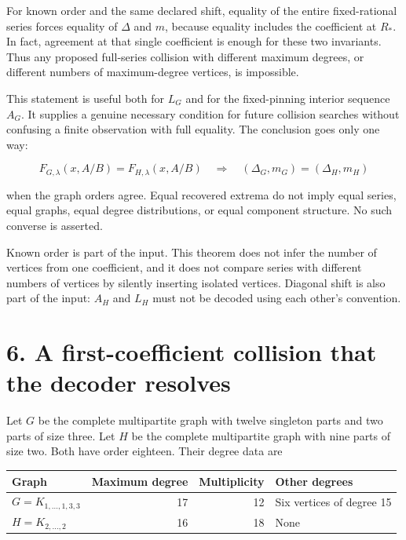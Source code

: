 \documentclass[
  11pt,
  a4paper,
]{report}
\begin{document}
For known order and the same declared shift, equality of the entire
fixed-rational series forces equality of \(\Delta\) and \(m\), because
equality includes the coefficient at \(R_*\). In fact, agreement at that
single coefficient is enough for these two invariants. Thus any proposed
full-series collision with different maximum degrees, or different
numbers of maximum-degree vertices, is impossible.

This statement is useful both for \(L_G\) and for the fixed-pinning
interior sequence \(A_G\). It supplies a genuine necessary condition for
future collision searches without confusing a finite observation with
full equality. The conclusion goes only one way:

\[
F_{G,\lambda}(x,A/B)=F_{H,\lambda}(x,A/B)
\quad\Longrightarrow\quad
(\Delta_G,m_G)=(\Delta_H,m_H)
\]

when the graph orders agree. Equal recovered extrema do not imply equal
series, equal graphs, equal degree distributions, or equal component
structure. No such converse is asserted.

Known order is part of the input. This theorem does not infer the number
of vertices from one coefficient, and it does not compare series with
different numbers of vertices by silently inserting isolated vertices.
Diagonal shift is also part of the input: \(A_H\) and \(L_H\) must not
be decoded using each other's convention.

\hypertarget{a-first-coefficient-collision-that-the-decoder-resolves}{%
\section{6. A first-coefficient collision that the decoder
resolves}\label{a-first-coefficient-collision-that-the-decoder-resolves}}

Let \(G\) be the complete multipartite graph with twelve singleton parts
and two parts of size three. Let \(H\) be the complete multipartite
graph with nine parts of size two. Both have order eighteen. Their
degree data are

\begin{longtable}[]{@{}lrrl@{}}
\toprule\noalign{}
Graph & Maximum degree & Multiplicity & Other degrees \\
\midrule\noalign{}
\endhead
\bottomrule\noalign{}
\endlastfoot
\(G=K_{1,\ldots,1,3,3}\) & 17 & 12 & Six vertices of degree 15 \\
\(H=K_{2,\ldots,2}\) & 16 & 18 & None \\
\end{longtable}
\end{document}

